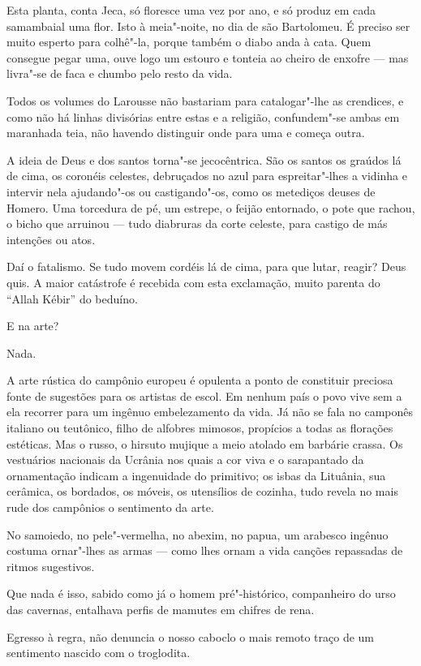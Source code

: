 Esta planta, conta Jeca, só floresce uma vez por ano, e só produz em
cada samambaial uma flor. Isto à meia"-noite, no dia de são Bartolomeu. É
preciso ser muito esperto para colhê"-la, porque também o diabo anda à
cata. Quem consegue pegar uma, ouve logo um estouro e tonteia ao cheiro
de enxofre --- mas livra"-se de faca e chumbo pelo resto da vida.

Todos os volumes do Larousse não bastariam para catalogar"-lhe as
crendices, e como não há linhas divisórias entre estas e a religião,
confundem"-se ambas em maranhada teia, não havendo distinguir onde para
uma e começa outra.

A ideia de Deus e dos santos torna"-se jecocêntrica. São os santos os
graúdos lá de cima, os coronéis celestes, debruçados no azul para
espreitar"-lhes a vidinha e intervir nela ajudando"-os ou castigando"-os,
como os metediços deuses de Homero. Uma torcedura de pé, um estrepe, o
feijão entornado, o pote que rachou, o bicho que arruinou --- tudo
diabruras da corte celeste, para castigo de más intenções ou atos.

Daí o fatalismo. Se tudo movem cordéis lá de cima, para que lutar,
reagir? Deus quis. A maior catástrofe é recebida com esta exclamação,
muito parenta do ``Allah Kébir'' do beduíno.

E na arte?

Nada.

A arte rústica do campônio europeu é opulenta a ponto de constituir
preciosa fonte de sugestões para os artistas de escol. Em nenhum país o
povo vive sem a ela recorrer para um ingênuo embelezamento da vida. Já
não se fala no camponês italiano ou teutônico, filho de alfobres
mimosos, propícios a todas as florações estéticas. Mas o russo, o
hirsuto mujique a meio atolado em barbárie crassa. Os vestuários
nacionais da Ucrânia nos quais a cor viva e o sarapantado da
ornamentação indicam a ingenuidade do primitivo; os isbas da Lituânia,
sua cerâmica, os bordados, os móveis, os utensílios de cozinha, tudo
revela no mais rude dos campônios o sentimento da arte.

No samoiedo, no pele"-vermelha, no abexim, no papua, um arabesco ingênuo
costuma ornar"-lhes as armas --- como lhes ornam a vida canções
repassadas de ritmos sugestivos.

Que nada é isso, sabido como já o homem pré"-histórico, companheiro do
urso das cavernas, entalhava perfis de mamutes em chifres de rena.

Egresso à regra, não denuncia o nosso caboclo o mais remoto traço de um
sentimento nascido com o troglodita.

